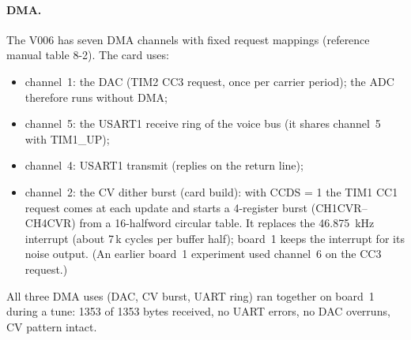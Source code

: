 \documentclass[11pt,a4paper]{article}
\newcommand{\file}[1]{\texttt{#1}}
\begin{document}
\begin{table}[htbp]
\centering\footnotesize
\setlength{\tabcolsep}{3.5pt}
\caption{Voice card MCU (\statVoiceMcu, TSSOP-20) pin map: nets from \file{hw/voice.py}, port names from the KiCad
symbol; generated.}\label{tab:pinsvoice}

\end{table}

\paragraph{DMA.} The V006 has seven DMA channels with fixed request mappings (reference manual table 8-2). The card
uses:
\begin{itemize}
  \item channel~1: the DAC (TIM2 CC3 request, once per carrier period); the ADC therefore runs without DMA;
  \item channel~5: the USART1 receive ring of the voice bus (it shares channel~5 with TIM1\_UP);
  \item channel~4: USART1 transmit (replies on the return line);
  \item channel~2: the CV dither burst (card build): with CCDS = 1 the TIM1 CC1 request comes at each update and
    starts a 4-register burst (CH1CVR--CH4CVR) from a 16-halfword circular table. It replaces the \SI{46.875}{kHz}
    interrupt (about 7\,k cycles per buffer half); board~1 keeps the interrupt for its noise output. (An earlier
    board~1 experiment used channel~6 on the CC3 request.)
\end{itemize}
All three DMA uses (DAC, CV burst, UART ring) ran together on board~1 during a tune: 1353 of 1353 bytes received, no
UART errors, no DAC overruns, CV pattern intact.
\end{document}
